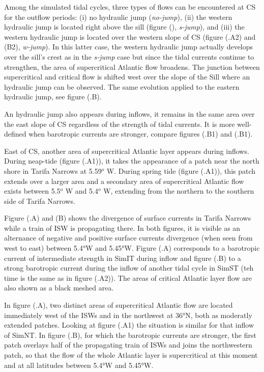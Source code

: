 Among the simulated tidal cycles, three types of flows can be encountered at CS for the outflow periods: (i) no hydraulic jump (\textit{no-jump}), (ii) the western hydraulic jump is located right above the sill (figure (), \textit{s-jump}), and (iii) the western hydraulic jump is located over the western slope of CS (figure (.A2) and (B2), \textit{w-jump}). In this latter case, the western hydraulic jump actually develops over the sill's crest as in the \textit{s-jump} case but since the tidal currents continue to strengthen, the area of supercritical Atlantic flow broadens. The junction between supercritical and critical flow is shifted west over the slope of the Sill where an hydraulic jump can be observed. The same evolution applied to the eastern hydraulic jump, see figure (.B). 

An hydraulic jump also appears during inflows, it remains in the same area over the east slope of CS regardless of the strength of tidal currents. It is more well-defined when barotropic currents are stronger, compare figures (.B1) and (.B1).

East of CS, another area of supercritical Atlantic layer appears during inflows. During neap-tide (figure (.A1)), it takes the appearance of a patch near the north shore in Tarifa Narrows at 5.59$^o$ W. During spring tide (figure (.A1)), this patch extends over a larger area and a secondary area of supercritical Atlantic flow exists between 5.5$^o$ W and 5.4$^o$ W, extending from the northern to the southern side of Tarifa Narrows. 

Figure (.A) and (B) shows the divergence of surface currents in Tarifa Narrows while a train of ISW is propagating there. In both figures, it is visible as an alternance of negative and positive surface currents divergence (when seen from west to east) between 5.4°W and 5.45°W. Figure (.A) corresponds to a barotropic current of intermediate strength in SimIT during inflow and figure (.B) to a strong barotropic current during the inflow of another tidal cycle in SimST (teh time is the same as in figure (.A2)). The areas of critical Atlantic layer flow are also shown as a black meshed area. 

In figure (.A), two distinct areas of supercritical Atlantic flow are located immediately west of the ISWs and in the northwest at 36°N, both as moderatly extended patches. Looking at figure (.A1) the situation is similar for that inflow of SimNT. In figure (.B), for which the barotropic currents are stronger, the first patch overlays half of the propagating train of ISWs and joins the northwestern patch, so that the flow of the whole Atlantic layer is supercritical at this moment and at all latitudes between 5.4°W and 5.45°W.

